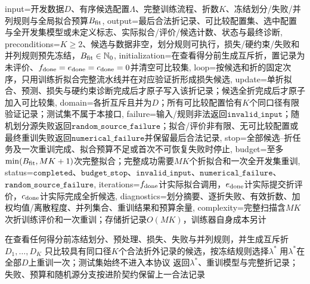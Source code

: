 \begin{AlgorithmContract}{
  input={开发数据$D$、有序候选配置$\Lambda$、完整训练流程、折数$K$、冻结划分/失败/并列规则与全局拟合预算$B_{\rm fit}$},
  output={最后合法折记录、可比较配置集、选中配置与全开发集模型或未定义标志、实际拟合/评价/候选计数、状态与最终诊断},
  preconditions={$K\ge2$、候选与数据非空，划分规则可执行，损失/硬约束/失败和并列规则预先冻结，$B_{\rm fit}\in\mathbb N_0$},
  initialization={在查看得分前生成互斥折，置记录为未评价、$f_{\rm done}=e_{\rm done}=c_{\rm done}=0$并清空可比较集},
  loop={按候选和折的固定次序，只用训练折拟合完整流水线并在对应验证折形成损失候选},
  update={单折拟合、预测、损失与硬约束诊断完成后才原子写入该折记录；候选全折完成后才原子加入可比较集},
  domain={各折互斥且并为$D$；所有可比较配置恰有$K$个同口径有限验证记录；测试集不属于本接口},
  failure={输入/规则非法返回$\mathtt{invalid\_input}$；随机划分源失败返回$\mathtt{random\_source\_failure}$；拟合/评价非有限、无可比较配置或最终重训失败返回$\mathtt{numerical\_failure}$并保留最后合法记录},
  stop={全部候选--折任务及一次重训完成、拟合预算不足或首次不可恢复失败时停止},
  budget={至多$\min(B_{\rm fit},MK+1)$次完整拟合；完整成功需要$MK$个折拟合和一次全开发集重训},
  status={$\mathtt{completed}$、$\mathtt{budget\_stop}$、$\mathtt{invalid\_input}$、$\mathtt{numerical\_failure}$、$\mathtt{random\_source\_failure}$},
  iterations={$f_{\rm done}$计实际拟合调用，$e_{\rm done}$计实际提交折评价，$c_{\rm done}$计实际完成全折候选},
  diagnostics={划分摘要、逐折失败、有效折数、加权均值/离散程度、并列集合、重训结果和预算余量},
  complexity={完整扫描含$MK$次折训练评价和一次重训；存储折记录$O(MK)$，训练器自身成本另计}
}
\begin{algorithm}[H]
\caption{无泄漏的\kFold{}模型选择}\label{alg:V1-C10-kfold}
在查看任何得分前冻结划分、预处理、损失、失败与并列规则，并生成互斥折$D_1,\ldots,D_K$\;
只比较具有同口径$K$个合法折外记录的候选，按冻结规则选择$\lambda^*$\;
用$\lambda^*$在全部$D$上重训一次；测试集始终不进入本协议\;
返回$\lambda^*$、重训模型与完整折记录；失败、预算和随机源分支按进阶契约保留上一合法记录\;
\end{algorithm}
\end{AlgorithmContract}

